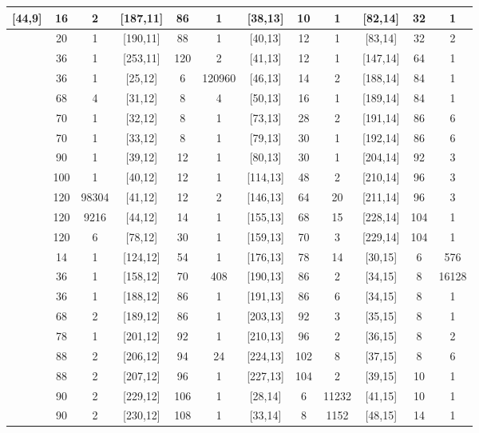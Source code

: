 \documentclass{article}
\begin{document}
\begin{longtable}{c|c|c||c|c|c||c|c|c||c|c|c}
[44,9] & 16 & 2 & [187,11] & 86 & 1
& [38,13] & 10 & 1 & [82,14] & 32 & 1 \\
\hline
[52,9] & 20 & 1 & [190,11] & 88 & 1
& [40,13] & 12 & 1 & [83,14] & 32 & 2 \\
\hline
[83,9] & 36 & 1 & [253,11] & 120 & 2
& [41,13] & 12 & 1 & [147,14] & 64 & 1 \\
\hline
[84,9] & 36 & 1 & [25,12] & 6 & 120960
& [46,13] & 14 & 2 & [188,14] & 84 & 1 \\
\hline
[148,9] & 68 & 4 & [31,12] & 8 & 4
& [50,13] & 16 & 1 & [189,14] & 84 & 1 \\
\hline
[149,9] & 70 & 1 & [32,12] & 8 & 1
& [73,13] & 28 & 2 & [191,14] & 86 & 6 \\
\hline
[150,9] & 70 & 1 & [33,12] & 8 & 1
& [79,13] & 30 & 1 & [192,14] & 86 & 6 \\
\hline
[189,9] & 90 & 1 & [39,12] & 12 & 1
& [80,13] & 30 & 1 & [204,14] & 92 & 3 \\
\hline
[210,9] & 100 & 1 & [40,12] & 12 & 1
& [114,13] & 48 & 2 & [210,14] & 96 & 3 \\
\hline
[248,9] & 120 & 98304 & [41,12] & 12 & 2
& [146,13] & 64 & 20 & [211,14] & 96 & 3 \\
\hline
[250,9] & 120 & 9216 & [44,12] & 14 & 1
& [155,13] & 68 & 15 & [228,14] & 104 & 1 \\
\hline
[251,9] & 120 & 6 & [78,12] & 30 & 1
& [159,13] & 70 & 3 & [229,14] & 104 & 1 \\
\hline
[43,10] & 14 & 1 & [124,12] & 54 & 1
& [176,13] & 78 & 14 & [30,15] & 6 & 576 \\
\hline
[84,10] & 36 & 1 & [158,12] & 70 & 408
& [190,13] & 86 & 2 & [34,15] & 8 & 16128 \\
\hline
[85,10] & 36 & 1 & [188,12] & 86 & 1
& [191,13] & 86 & 6 & [34,15] & 8 & 1 \\
\hline
[149,10] & 68 & 2 & [189,12] & 86 & 1
& [203,13] & 92 & 3 & [35,15] & 8 & 1 \\
\hline
[167,10] & 78 & 1 & [201,12] & 92 & 1
& [210,13] & 96 & 2 & [36,15] & 8 & 2 \\
\hline
[188,10] & 88 & 2 & [206,12] & 94 & 24
& [224,13] & 102 & 8 & [37,15] & 8 & 6 \\
\hline
[189,10] & 88 & 2 & [207,12] & 96 & 1
& [227,13] & 104 & 2 & [39,15] & 10 & 1 \\
\hline
[190,10] & 90 & 2 & [229,12] & 106 & 1
& [28,14] & 6 & 11232 & [41,15] & 10 & 1 \\
\hline
[191,10] & 90 & 2 & [230,12] & 108 & 1
& [33,14] & 8 & 1152 & [48,15] & 14 & 1 \\

\end{longtable}
\end{document}
